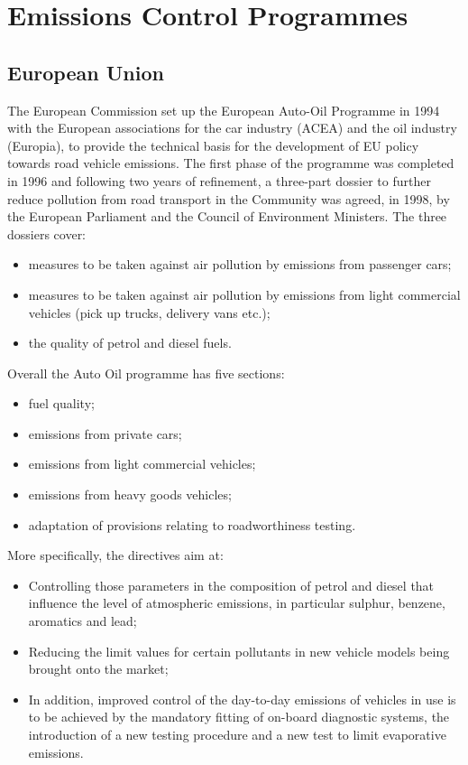 \section{Emissions Control Programmes}
\subsection{European Union}
The European Commission set up the European Auto-Oil Programme in 1994 with the European associations for the car industry (ACEA) and the oil industry (Europia), to provide the technical basis for the development of EU policy towards road vehicle emissions. The first phase of the programme was completed in 1996 and following two years of refinement, a three-part dossier to further reduce pollution from road transport in the Community was agreed, in 1998, by the European Parliament and the Council of Environment Ministers. The three dossiers cover:
\begin{itemize}
	\item measures to be taken against air pollution by emissions from passenger cars;
	\item measures to be taken against air pollution by emissions from light commercial vehicles (pick up trucks, delivery vans etc.);
	\item the quality of petrol and diesel fuels.
\end{itemize}
Overall the Auto Oil programme has five sections:
\begin{itemize}
	\item fuel quality;
	\item emissions from private cars;
	\item emissions from light commercial vehicles;
	\item emissions from heavy goods vehicles;
	\item adaptation of provisions relating to roadworthiness testing.
\end{itemize}
More specifically, the directives aim at:
\begin{itemize}
	\item Controlling those parameters in the composition of petrol and diesel that influence the level of atmospheric emissions, in particular sulphur, benzene, aromatics and lead;
	\item Reducing the limit values for certain pollutants in new vehicle models being brought onto the market;
	\item In addition, improved control of the day-to-day emissions of vehicles in use is to be achieved by the mandatory fitting of on-board diagnostic systems, the introduction of a new testing procedure and a new test to limit evaporative emissions.
\end{itemize}